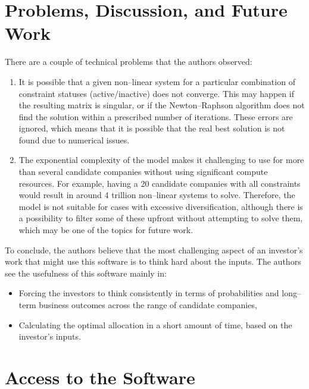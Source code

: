 \documentclass{article}
\begin{document}
\section{Problems, Discussion, and Future Work}
\label{sec:futureWork}

\noindent There are a couple of technical problems that the authors observed:
\begin{enumerate}
    \item It is possible that a given non--linear system for a particular
    combination of constraint statuses (active/inactive) does not converge. This
    may happen if the resulting matrix is singular, or if the Newton--Raphson
    algorithm does not find the solution within a prescribed number of
    iterations. These errors are ignored, which means that it is possible that
    the real best solution is not found due to numerical issues.
    \item The exponential complexity of the model makes it challenging to
    use for more than several candidate companies without using significant
    compute resources. For example, having a 20 candidate companies with all
    constraints would result in around 4 trillion non--linear systems to solve.
    Therefore, the model is not suitable for cases with excessive
    diversification, although there is a possibility to filter some of these
    upfront without attempting to solve them, which may be one of the topics for
    future work.
\end{enumerate}

\indent To conclude, the authors believe that the most challenging aspect of an
investor's work that might use this software is to think hard about the inputs.
The authors see the usefulness of this software mainly in:
\begin{itemize}
    \item Forcing the investors to think consistently in terms of probabilities
    and long--term business outcomes across the range of candidate companies,
    \item Calculating the optimal allocation in a short amount of time, based on
    the investor's inputs.
\end{itemize}

\section{Access to the Software}

\clearpage



\end{document}
